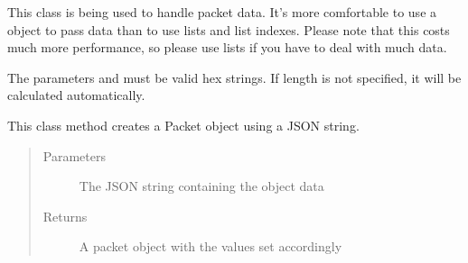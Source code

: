 \documentclass[letterpaper,10pt,english]{sphinxmanual}
\begin{document}
\begin{fulllineitems}
\label{\detokenize{src:src.Packet.Packet}}
This class is being used to handle packet data.
It’s more comfortable to use a object to pass data
than to use lists and list indexes. Please note that
this costs much more performance, so please use lists
if you have to deal with much data.

\begin{fulllineitems}
\label{\detokenize{src:src.Packet.Packet.__init__}}
The parameters  and  must be valid hex strings.
If length is not specified, it will be calculated automatically.

\end{fulllineitems}


\begin{fulllineitems}
\label{\detokenize{src:src.Packet.Packet.fromJSON}}
This class method creates a Packet object using a JSON string.
\begin{quote}\begin{description}
\item[{Parameters}] \leavevmode
{} \textendash{} The JSON string containing the object data

\item[{Returns}] \leavevmode
A packet object with the values set accordingly

\end{description}\end{quote}

\end{fulllineitems}



\end{fulllineitems}
\end{document}
